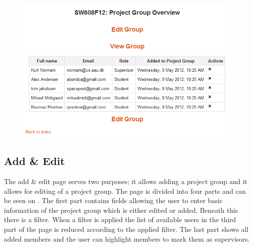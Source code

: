 \begin{figure}
	\centering
		\includegraphics[width=\textwidth]{images/moodleprojectgroupoverview.png}
	\label{fig:moodlepoverview}
\end{figure}
\FloatBarrier

\subsection{Add \& Edit}
\label{sec:addandedit}
The add \& edit page serves two purposes; it allows adding a project group and it allows for editing of a project group.
The page is divided into four parts and can be seen on . 
The first part contains fields allowing the user to enter basic information of the project group which is either edited or added. 
Beneath this there is a filter.
When a filter is applied the list of available users in the third part of the page is reduced according to the applied filter. 
The last part shows all added members and the user can highlight members to mark them as supervisors. 


